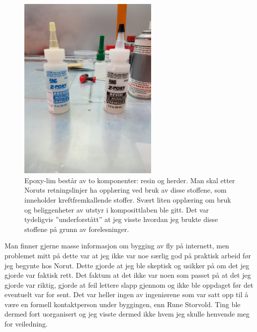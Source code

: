 \documentclass[12pt, a4paper]{article}
\begin{document}
\begin{figure}[h]
	\centering
	\includegraphics[width = .6\textwidth, height=9cm]{bilder/epoxyresin.jpg}

	\caption[Epoxy og herder]{Epoxy-lim består av to komponenter: resin og herder. Man skal etter Noruts retningslinjer ha opplæring ved bruk av disse stoffene, som inneholder kreftfremkallende stoffer. Svært liten opplæring om bruk og beliggenheter av utstyr i komposittlaben ble gitt. Det var tydeligvis ''underforstått'' at jeg visste hvordan jeg brukte disse stoffene på grunn av forelesninger.}




\end{figure}

Man finner gjerne masse informasjon om bygging av fly på internett, men problemet mitt på dette var at jeg ikke var noe særlig god på praktisk arbeid før jeg begynte hos Norut. Dette gjorde at jeg ble skeptisk og usikker på om det jeg gjorde var faktisk rett. Det faktum at det ikke var noen som passet på at det jeg gjorde var riktig, gjorde at feil lettere slapp gjennom og ikke ble oppdaget før det eventuelt var for sent. Det var heller ingen av ingeniørene som var satt opp til å være en formell kontaktperson under byggingen, enn Rune Storvold. Ting ble dermed fort uorganisert og jeg visste dermed ikke hvem jeg skulle henvende meg for veiledning. \\
\end{document}
